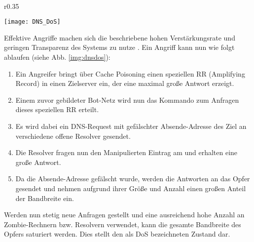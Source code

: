 \paragraph{}
\begin{wrapfigure}{r}{0.35\textwidth}
    \begin{center}
        \texttt{[image: DNS\_DoS]}
    \end{center}
    \caption{}
    \label{img:dnsdos}
\end{wrapfigure}
Effektive Angriffe machen sich die beschriebene hohen Verstärkungsrate und geringen Transparenz des Systems zu nutze \cite{Kambourakis2008}. Ein Angriff kann nun wie folgt ablaufen (siehe Abb. \ref{img:dnsdos}):
\begin{enumerate}
    \item Ein Angreifer bringt über Cache Poisoning einen speziellen RR (Amplifying Record) in einen Zielserver ein, der eine maximal große Antwort erzeigt.
    \item Einem zuvor gebildeter Bot-Netz wird nun das Kommando zum Anfragen dieses speziellen RR erteilt. 
    \item Es wird dabei ein DNS-Request mit gefälschter Absende-Adresse des Ziel an verschiedene offene Resolver gesendet.
    \item Die Resolver fragen nun den Manipulierten Eintrag am und erhalten eine große Antwort.
    \item Da die Absende-Adresse gefälscht wurde, werden die Antworten an das Opfer gesendet und nehmen aufgrund ihrer Größe und Anzahl einen großen Anteil der Bandbreite ein. 
\end{enumerate}
Werden nun stetig neue Anfragen gestellt und eine ausreichend hohe Anzahl an Zombie-Rechnern bzw. Resolvern verwendet, kann die gesamte Bandbreite des Opfers saturiert werden. Dies stellt den als DoS bezeichneten Zustand dar.



